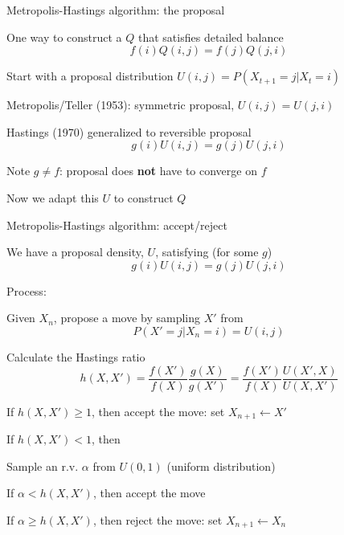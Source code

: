 \documentclass{beamer}
\begin{document}
\begin{frame}{Metropolis-Hastings algorithm: the proposal}

\itemb
\item One way to construct a $Q$ that satisfies detailed balance
\[
f(i) Q(i,j) = f(j) Q(j,i)
\]
\item Start with a \alert{proposal distribution} $U(i,j) = P(X_{t+1}=j|X_t=i)$
 \itemb
 \item Metropolis/Teller (1953): \alert{symmetric} proposal, $U(i,j)=U(j,i)$
 \item Hastings (1970) generalized to \alert{reversible} proposal
\[
g(i)U(i,j)=g(j)U(j,i)
\]
 \item Note $g \neq f$: proposal does {\bf not} have to converge on $f$
 \iteme
\item Now we adapt this $U$ to construct $Q$
\iteme

\end{frame}


\begin{frame}{Metropolis-Hastings algorithm: accept/reject}

\itemb
\item We have a proposal density, $U$, satisfying (for some $g$)
\[
g(i)U(i,j)=g(j)U(j,i)
\]
\item Process:
 \itemb
 \item Given $X_n$, \alert{propose a move} by sampling $X'$ from
\[
P(X'=j|X_n=i) = U(i,j)
\]
 \item Calculate the \alert{Hastings ratio}
\[
h(X,X') = \frac{f(X')}{f(X)} \frac{g(X)}{g(X')} = \frac{f(X')}{f(X)} \frac{U(X',X)}{U(X,X')}
\]
 \item If $h(X,X') \geq 1$, then \alert{accept the move}: set $X_{n+1} \leftarrow X'$
 \item If $h(X,X') < 1$, then
  \itemb
  \item Sample an r.v. $\alpha$ from $U(0,1)$ (uniform distribution)
  \item If $\alpha < h(X,X')$, then accept the move
  \item If $\alpha \geq h(X,X')$, then \alert{reject the move}: set $X_{n+1} \leftarrow X_n$
  \iteme
 \iteme
\iteme

\end{frame}
\end{document}
